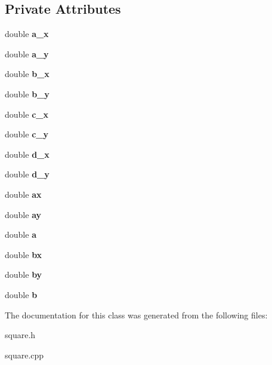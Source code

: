\subsection*{Private Attributes}
\begin{DoxyCompactItemize}
\item 
\mbox{\label{classsquare_a11fd76f933347c67bb461682b32b351e}} 
double {\bfseries a\+\_\+x}
\item 
\mbox{\label{classsquare_a84b4b43fe1b571f9608bc326935cb1f5}} 
double {\bfseries a\+\_\+y}
\item 
\mbox{\label{classsquare_ac1b3e9c660a0cfcd033c1680e8050109}} 
double {\bfseries b\+\_\+x}
\item 
\mbox{\label{classsquare_a7462258503d8f0989db7005fa21f20ed}} 
double {\bfseries b\+\_\+y}
\item 
\mbox{\label{classsquare_a3e75f76ddf37a87cbf85108b5404d9ec}} 
double {\bfseries c\+\_\+x}
\item 
\mbox{\label{classsquare_a2a8631e98f5ead46e78cb22b7c2b6d35}} 
double {\bfseries c\+\_\+y}
\item 
\mbox{\label{classsquare_ae759be39ebe1642d767fa2e0307e7ac6}} 
double {\bfseries d\+\_\+x}
\item 
\mbox{\label{classsquare_ae28f6ec4408a55d969fdbba126913145}} 
double {\bfseries d\+\_\+y}
\item 
\mbox{\label{classsquare_a46a4cd556ccd056fca045fb7ce924203}} 
double {\bfseries ax}
\item 
\mbox{\label{classsquare_a72d523a2eb145eb01c84a4372a074f51}} 
double {\bfseries ay}
\item 
\mbox{\label{classsquare_acdbbea08c6d5bcfb87311b968ae7737a}} 
double {\bfseries a}
\item 
\mbox{\label{classsquare_a5dbab7fbfae9af7c8d3fc2f4f103354e}} 
double {\bfseries bx}
\item 
\mbox{\label{classsquare_a0e67ec8b3dd0e3b987b9e8a8e1c8c825}} 
double {\bfseries by}
\item 
\mbox{\label{classsquare_a86c268d4cf00e1d7a20b400597e0624c}} 
double {\bfseries b}
\end{DoxyCompactItemize}


The documentation for this class was generated from the following files\+:\begin{DoxyCompactItemize}
\item 
square.\+h\item 
square.\+cpp\end{DoxyCompactItemize}

